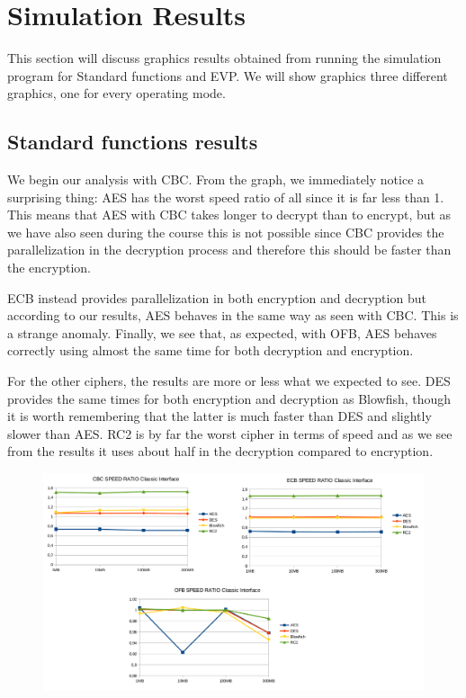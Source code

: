 \documentclass[11pt]{article}
\begin{document}
\newpage
\section{Simulation Results}
This section will discuss graphics results obtained from running the simulation program for Standard functions and EVP. We will show graphics three different graphics, one for every operating mode.

\subsection{Standard functions results}
We begin our analysis with CBC. From the graph, we immediately notice a surprising thing: AES has the worst speed ratio of all since it is far less than 1. This means that AES with CBC takes longer to decrypt than to encrypt, but as we have also seen during the course this is not possible since CBC provides the parallelization in the decryption process and therefore this should be faster than the encryption. 

ECB instead provides parallelization in both encryption and decryption but according to our results, AES behaves in the same way as seen with CBC. 
This is a strange anomaly. Finally, we see that, as expected, with OFB, AES behaves correctly using almost the same time for both 
decryption and encryption.

For the other ciphers, the results are more or less what we expected to see. DES provides the same times for both encryption and decryption as Blowfish, though it is worth remembering that the latter is much faster than DES and slightly slower than AES. RC2 is by far the worst cipher 
in terms of speed and as we see from the results it uses about half in the decryption compared to encryption.

\begin{figure}[!ht]
  \includegraphics[width=1\textwidth]{pic2-hw1-1635747}
  \label{fig:Standard functions result}
\end{figure}
\end{document}
